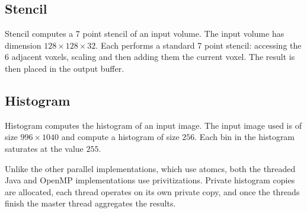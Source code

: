 \subsection{Stencil}

Stencil computes a 7 point stencil of an input volume. 
The input volume has dimension $128 \times 128 \times 32$.
Each performs a standard 7 point stencil: accessing the $6$ adjacent voxels,
	scaling and then adding them the current voxel.
The result is then placed in the output buffer.

\subsection{Histogram}

Histogram computes the histogram of an input image.
The input image used is of size $996 \times 1040$ and compute a 
	histogram of size $256$.
Each bin in the histogram saturates at the value $255$.

Unlike the other parallel implementations, which use atomcs, both the
	threaded Java and OpenMP implementations use privitizations.
Private histogram copies are allocated, each thread 
	operates on its own private copy, and once the threads finish the
	master thread aggregates the results.

